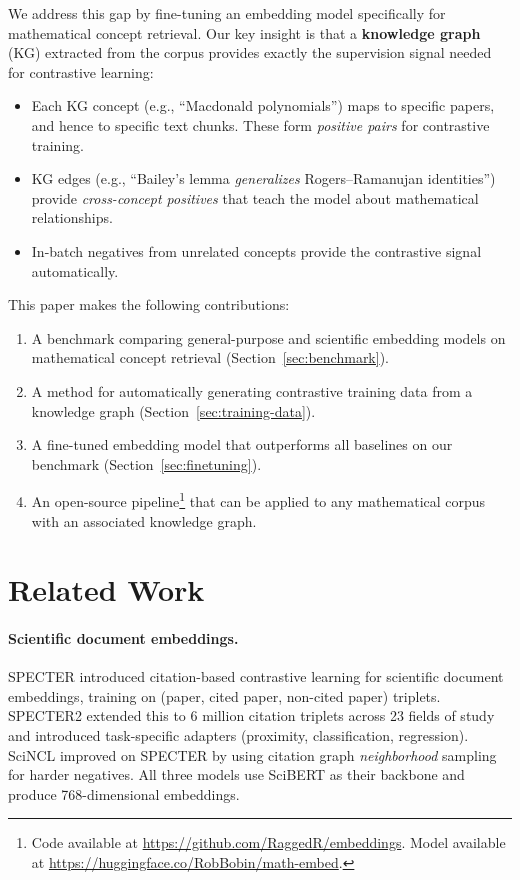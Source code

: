 \documentclass[11pt,a4paper]{article}
\begin{document}
We address this gap by fine-tuning an embedding model specifically for
mathematical concept retrieval. Our key insight is that a \textbf{knowledge
graph} (KG) extracted from the corpus provides exactly the supervision signal
needed for contrastive learning:
\begin{itemize}[nosep]
    \item Each KG concept (e.g., ``Macdonald polynomials'') maps to specific
          papers, and hence to specific text chunks. These form
          \emph{positive pairs} for contrastive training.
    \item KG edges (e.g., ``Bailey's lemma \emph{generalizes}
          Rogers--Ramanujan identities'') provide \emph{cross-concept
          positives} that teach the model about mathematical relationships.
    \item In-batch negatives from unrelated concepts provide the contrastive
          signal automatically.
\end{itemize}

This paper makes the following contributions:
\begin{enumerate}[nosep]
    \item A benchmark comparing general-purpose and scientific embedding
          models on mathematical concept retrieval (Section~\ref{sec:benchmark}).
    \item A method for automatically generating contrastive training data from
          a knowledge graph (Section~\ref{sec:training-data}).
    \item A fine-tuned embedding model that outperforms all baselines on our
          benchmark (Section~\ref{sec:finetuning}).
    \item An open-source pipeline\footnote{Code available at
          \url{https://github.com/RaggedR/embeddings}. Model available at
          \url{https://huggingface.co/RobBobin/math-embed}.} that can be applied to any
          mathematical corpus with an associated knowledge graph.
\end{enumerate}


\section{Related Work}

\paragraph{Scientific document embeddings.}
SPECTER \cite{specter} introduced citation-based contrastive learning for
scientific document embeddings, training on (paper, cited paper, non-cited
paper) triplets. SPECTER2 \cite{specter2} extended this to 6 million citation
triplets across 23 fields of study and introduced task-specific adapters
(proximity, classification, regression). SciNCL \cite{scincl} improved on
SPECTER by using citation graph \emph{neighborhood} sampling for harder
negatives. All three models use SciBERT \cite{scibert} as their backbone and
produce 768-dimensional embeddings.
\end{document}
